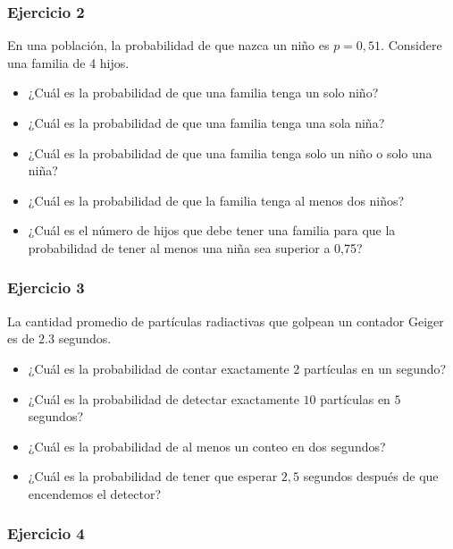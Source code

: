 \documentclass[
]{book}
\providecommand{\tightlist}{%
  \setlength{\itemsep}{0pt}\setlength{\parskip}{0pt}}
\begin{document}
\hypertarget{ejercicio-2-4}{%
\subsubsection{Ejercicio 2}\label{ejercicio-2-4}}

En una población, la probabilidad de que nazca un niño es \(p=0,51\). Considere una familia de 4 hijos.

\begin{itemize}
\tightlist
\item
  ¿Cuál es la probabilidad de que una familia tenga un solo niño?
\item
  ¿Cuál es la probabilidad de que una familia tenga una sola niña?
\item
  ¿Cuál es la probabilidad de que una familia tenga solo un niño o solo una niña?
\item
  ¿Cuál es la probabilidad de que la familia tenga al menos dos niños?
\item
  ¿Cuál es el número de hijos que debe tener una familia para que la probabilidad de tener al menos una niña sea superior a 0,75?
\end{itemize}

\hypertarget{ejercicio-3-2}{%
\subsubsection{Ejercicio 3}\label{ejercicio-3-2}}

La cantidad promedio de partículas radiactivas que golpean un contador Geiger es de \(2.3\) segundos.

\begin{itemize}
\item
  ¿Cuál es la probabilidad de contar exactamente 2 partículas en un segundo?
\item
  ¿Cuál es la probabilidad de detectar exactamente \(10\) partículas en \(5\) segundos?
\item
  ¿Cuál es la probabilidad de al menos un conteo en dos segundos?
\item
  ¿Cuál es la probabilidad de tener que esperar \(2,5\) segundos después de que encendemos el detector?
\end{itemize}

\hypertarget{ejercicio-4-2}{%
\subsubsection{Ejercicio 4}\label{ejercicio-4-2}}
\end{document}
